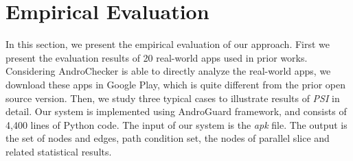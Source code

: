 \section{Empirical Evaluation}
In this section, we present the empirical evaluation of our approach. First we present the evaluation results of 20 real-world apps used in prior works\cite{new2015static, new2015window}. Considering AndroChecker is able to directly analyze the real-world apps, we download these apps in Google Play, which is quite different from the prior open source version. Then, we study three typical cases to illustrate results of \textit{PSI} in detail. Our system is implemented using AndroGuard\cite{new2013androguard} framework, and consists of 4,400 lines of Python code. The input of our system is the \textit{apk} file. The output is the set of nodes and edges, path condition set, the nodes of parallel slice and related statistical results.

